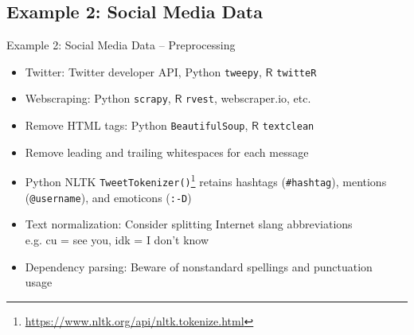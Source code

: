 \documentclass{beamer}
\renewcommand{\cite}{\citep}
\begin{document}
\subsection{Example 2: Social Media Data}






\begin{frame}{Example 2: Social Media Data -- Preprocessing}
\begin{itemize}
\item Twitter: Twitter developer API, Python \texttt{tweepy}, $\mathsf{R}$ \texttt{twitteR}
\item Webscraping: Python \texttt{scrapy}, $\mathsf{R}$ \texttt{rvest}, webscraper.io, etc.
	\bigskip
\item Remove HTML tags: Python \texttt{BeautifulSoup}, $\mathsf{R}$ \texttt{textclean}
\item Remove leading and trailing whitespaces for each message
\item Python NLTK \texttt{TweetTokenizer()}\footnote{\url{https://www.nltk.org/api/nltk.tokenize.html}} retains hashtags (\texttt{\#hashtag}), mentions (\texttt{@username}), and emoticons (\texttt{:-D})
	\bigskip
\item Text normalization: Consider splitting Internet slang abbreviations\\
	e.g. cu = see you, idk = I don't know~\cite{pennell2011toward} 
\item Dependency parsing: Beware of nonstandard spellings and punctuation usage~\cite{blodgett2018twitter}
\end{itemize}
\end{frame}
\end{document}

